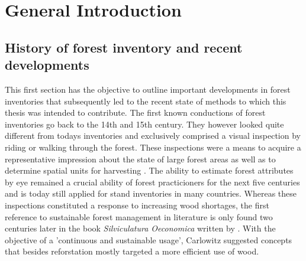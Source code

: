 	

			
	

	
\chapter{General Introduction}
\label{chap:intro}
\newpage
\section{History of forest inventory and recent developments}
\label{sec:intro:hist_soa}

This first section has the objective to outline important developments in forest inventories that subsequently led to the recent state of methods to which this thesis was intended to contribute. 
The first known conductions of forest inventories go back to the 14th and 15th century. They however looked quite different from todays inventories and exclusively comprised a visual inspection by riding or walking through the forest. These inspections were a means to acquire a representative impression about the state of large forest areas as well as to determine spatial units for harvesting \citep{zoehrer1980}. The ability to estimate forest attributes by eye remained a crucial ability of forest practicioners for the next five centuries and is today still applied for stand inventories in many countries. Whereas these inspections constituted a response to increasing wood shortages, the first reference to sustainable forest management in literature is only found two centuries later in the book \textit{Silviculatura Oeconomica} written by \citet{carlowitz1713}. With the objective of a 'continuous and sustainable usage', Carlowitz suggested concepts that besides reforstation mostly targeted a more efficient use of wood.\par


